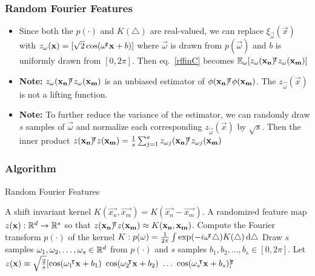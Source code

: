 \documentclass[10pt]{../formats/RU}
\begin{document}
\begin{frame}
  \frametitle{Random Fourier Features}
  \begin{itemize}
    \item <1-> Since both the $p(\cdot)$ and $K(\triangle)$ are real-valued, we can replace $\xi_{\vec{\omega}}(\vec{x})$ with $z_{\mathbf{\omega}}(\mathbf{x})=[\sqrt{2}\cos(\mathbf{\omega}{}^{\mkern-4mu\intercal}\mathbf{x}+b)]$ where $\vec{\omega}$ is drawn from $p(\vec{\omega})$ and $b$ is uniformly drawn from $[0, 2\pi]$. Then eq.~\eqref{rffinC} becomes $\mathbb{E}_{\mathbf{\omega}}[z_{\mathbf{\omega}}(\mathbf{x_n}){}^{\mkern-4mu\intercal} z_{\mathbf{\omega}}(\mathbf{x_m})]$
    \item <2-> \textbf{Note:} $z_{\mathbf{\omega}}(\mathbf{x_n}){}^{\mkern-4mu\intercal} z_{\mathbf{\omega}}(\mathbf{x_m})$ is an unbiased estimator of $\phi(\mathbf{x_n}){}^{\mkern-4mu\intercal}\phi(\mathbf{x_m})$. The $z_{\vec{\omega}}(\vec{x})$ is not a lifting function.
    \item <3-> \textbf{Note:} To further reduce the variance of the estimator, we can randomly draw $s$ samples of $\vec{\omega}$ and normalize each corresponding $z_{\vec{\omega}}(\vec{x})$ by $\sqrt{s}$. Then the inner product $z(\mathbf{x_n}){}^{\mkern-4mu\intercal} z(\mathbf{x_m})=\frac{1}{s}\sum_{j=1}^{s}z_{\mathbf{\omega}j}(\mathbf{x_n}){}^{\mkern-4mu\intercal} z_{\mathbf{\omega}j}(\mathbf{x_m})$
  \end{itemize}
\end{frame}
\begin{frame}
  \frametitle{Algorithm}
  \begin{algorithm}[H]
    \caption{Random Fourier Features}\label{RFF}
    \begin{algorithmic}
    \Require A shift invariant kernel $K(\vec{x_n}, \vec{x_m}) = K(\vec{x_n}- \vec{x_m})$.
    \Ensure A randomized feature map $z(\mathbf{x}): \mathbb{R}^d\rightarrow\mathbb{R}^s$ so that $z(\mathbf{x_n}){}^{\mkern-4mu\intercal} z(\mathbf{x_m})\approx K(\mathbf{x_n}, \mathbf{x_m})$.
    \State Compute the Fourier transform $p(\cdot)$ of the kernel $K: p(\mathbf{\omega})=\frac{1}{2\pi}\int \exp(-i\mathbf{\omega}{}^{\mkern-4mu\intercal}\triangle)K(\triangle)\mathop{}\!\mathrm{d}\triangle$
    \State Draw $s$ \iid samples $\mathbf{\omega}_1, \mathbf{\omega}_2, \ldots, \mathbf{\omega}_s \in \mathbb{R}^d$ from $p(\cdot)$ and $s$ \iid samples $b_1, b_2, \ldots, b_s \in [0, 2\pi]$.
    \State Let $z(\vec{x})\equiv \sqrt{\frac{2}{s}}[\cos(\vec{\omega}_1\trn\vec{x}+b_1)\ \cos(\vec{\omega}_2\trn\vec{x}+b_2)\ \ldots\ \cos(\vec{\omega}_s\trn\vec{x}+b_s)]\trn$
    \end{algorithmic}
  \end{algorithm}
\end{frame}
\end{document}
